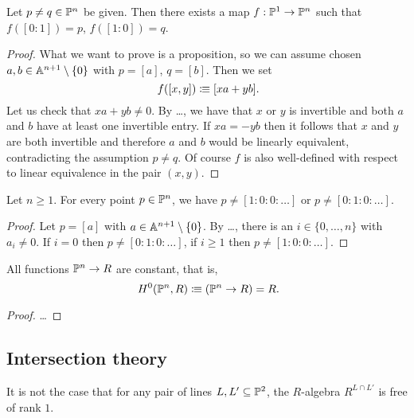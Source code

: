 \begin{lemma}
  Let $p \neq q \in \mathbb{P}^n$ be given.
  Then there exists a map $f : \mathbb{P}^1 \to \mathbb{P}^n$
  such that $f([0 : 1]) = p$, $f([1 : 0]) = q$.
\end{lemma}

\begin{proof}
  What we want to prove is a proposition,
  so we can assume chosen $a, b \in \mathbb{A}^{n+1} \setminus \{0\}$
  with $p = [a]$, $q = [b]$.
  Then we set
  \[ f([x, y]) \colonequiv [xa + yb] \rlap{.}\]
  Let us check that $xa + yb \neq 0$.
  By \dots,
  we have that $x$ or $y$ is invertible
  and both $a$ and $b$ have at least one invertible entry.
  If $xa = - yb$
  then it follows that $x$ and $y$ are both invertible
  and therefore $a$ and $b$ would be linearly equivalent,
  contradicting the assumption $p \neq q$.
  Of course $f$ is also well-defined
  with respect to linear equivalence in the pair $(x, y)$.
\end{proof}

\begin{lemma}
  Let $n \geq 1$.
  For every point $p \in \mathbb{P}^n$,
  we have $p \neq [1 : 0 : 0 : \dots]$
  or $p \neq [0 : 1 : 0 : \dots]$.
\end{lemma}

\begin{proof}
  Let $p = [a]$ with $a \in \mathbb{A}^{n+1} \setminus \{0\}$.
  By \dots,
  there is an $i \in \{0, \dots, n\}$ with $a_i \neq 0$.
  If $i = 0$ then $p \neq [0 : 1 : 0 : \dots]$,
  if $i \geq 1$ then $p \neq [1 : 0 : 0 : \dots]$.
\end{proof}

\begin{theorem}
  All functions $\mathbb{P}^n \to R$ are constant,
  that is,
  \[ H^0(\bP^n, R) \colonequiv (\bP^n \to R) = R \rlap{.} \]
\end{theorem}

\begin{proof}
  \dots
\end{proof}


\subsection{Intersection theory}

\begin{example}
  It is not the case that
  for any pair of lines $L, L' \subseteq \mathbb{P}^2$,
  the $R$-algebra $R^{L \cap L'}$ is free of rank $1$.
\end{example}

